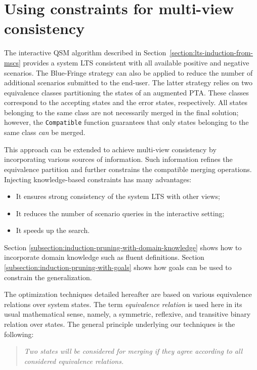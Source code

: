 \section{Using constraints for multi-view consistency\label{section:inductive-mutliview-consistency}}

The interactive QSM algorithm described in Section~\ref{section:lts-induction-from-mscs} provides a system LTS consistent with all available positive and negative scenarios. The Blue-Fringe strategy can also be applied to reduce the number of additional scenarios submitted to the end-user. The latter strategy relies on two equivalence classes partitioning the states of an augmented PTA. These classes correspond to the accepting states and the error states, respectively. All states belonging to the same class are not necessarily merged in the final solution; however, the \texttt{Compatible} function guarantees that only states belonging to the same class \emph{can} be merged.

This approach can be extended to achieve multi-view consistency by incorporating various sources of information. Such information refines the equivalence partition and further constrains the compatible merging operations. Injecting knowledge-based constraints has many advantages: 
\begin{itemize}
\item It ensures strong consistency of the system LTS with other views;
\item It reduces the number of scenario queries in the interactive setting;
\item It speeds up the search.
\end{itemize}

Section \ref{subsection:induction-pruning-with-domain-knowledge} shows how to incorporate domain knowledge such as fluent definitions. Section \ref{subsection:induction-pruning-with-goals} shows how goals can be used to constrain the generalization. 

The optimization techniques detailed hereafter are based on various equivalence relations over system states. The term \emph{equivalence relation} is used here in its usual mathematical sense, namely, a symmetric, reflexive, and transitive binary relation over states. The general principle underlying our techniques is the following:
\begin{quote}
\emph{Two states will be considered for merging if they agree according to all considered equivalence relations.}
\end{quote}

